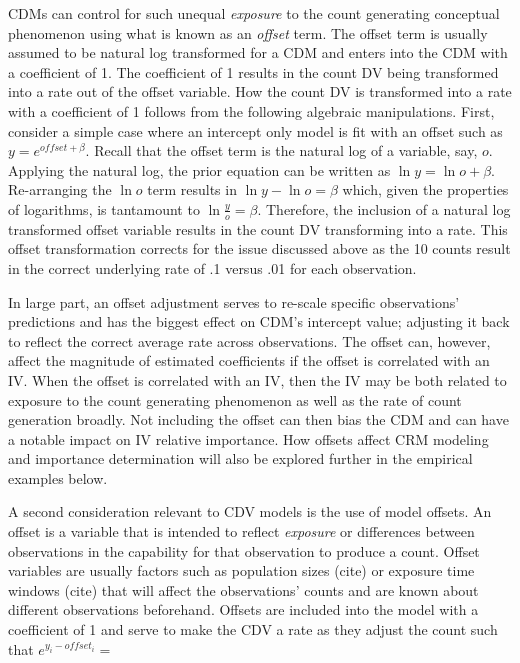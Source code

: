 \documentclass[ShortAfour,times,sageapa]{sagej}
\begin{document}
	CDMs can control for such unequal \emph{exposure} to the count generating conceptual phenomenon using what is known as an \emph{offset} term.  
	The offset term is usually assumed to be natural log transformed for a CDM and enters into the CDM with a coefficient of 1.
	The coefficient of 1 results in the count DV being transformed into a rate out of the offset variable.
	How the count DV is transformed into a rate with a coefficient of 1 follows from the following algebraic manipulations.
	First, consider a simple case where an intercept only model is fit with an offset such as $y = e^{offset + \beta}$.
	Recall that the offset term is the natural log of a variable, say, $o$.  
	Applying the natural log, the prior equation can be written as $\ln y = \ln o + \beta$.
	Re-arranging the $\ln o$ term results in $\ln y - \ln o = \beta$ which, given the properties of logarithms, is tantamount to $\ln \frac{y}{o} = \beta$.
	Therefore, the inclusion of a natural log transformed offset variable results in the count DV transforming into a rate.
	This offset transformation corrects for the issue discussed above as the 10 counts result in the correct underlying rate of .1 versus .01 for each observation.
	
	In large part, an offset adjustment serves to re-scale specific observations' predictions and has the biggest effect on CDM's intercept value; adjusting it back to reflect the correct average rate across observations.
	The offset can, however, affect the magnitude of estimated coefficients if the offset is correlated with an IV.  
	When the offset is correlated with an IV, then the IV may be both related to exposure to the count generating phenomenon as well as the rate of count generation broadly.
	Not including the offset can then bias the CDM and can have a notable impact on IV relative importance.
	How offsets affect CRM modeling and importance determination will also be explored further in the empirical examples below.
	
	
	A second consideration relevant to CDV models is the use of model offsets.  An offset is a variable that is intended to reflect \emph{exposure} or differences between observations in the capability for that observation to produce a count.  Offset variables are usually factors such as population sizes (cite) or exposure time windows (cite) that will affect the observations' counts and are known about different observations beforehand.  Offsets are included into the model with a coefficient of 1 and serve to make the CDV a rate as they adjust the count such that $e^{y_{i} - offset_{i}} = $
	
\end{document}

